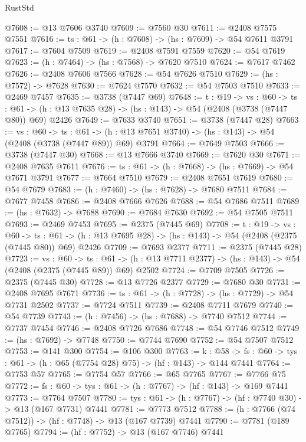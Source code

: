 \begin{lexlean}{RustStd}
\begin{coremodule}
@7608 := @13 @7606 @3740
@7609 := @7560 @30
@7611 := @2408 @7575 @7551
@7616 := {ts : @61} -> (h : @7608) -> (hs : @7609) -> @54 @7611 @3791
@7617 := @7604 @7509
@7619 := @2408 @7591 @7559
@7620 := @54 @7619
@7623 := (h : @7464) -> (hs : @7568) -> @7620 @7510
@7624 := @7617 @7462
@7626 := @2408 @7606 @7566
@7628 := @54 @7626 @7510
@7629 := (hs : @7572) -> @7628
@7630 := @7624 @7570
@7632 := @54 @7503 @7510
@7633 := @2469 @7457
@7635 := @3738 (@7447 @69)
@7648 := {t : @19} ->
  {vs : @60} ->
  {ts : @61} -> (h : @13 @7635 @28) -> (hs : @143) -> @54 (@2408 (@3738 (@7447 @80)) @69) @2426
@7649 := @7633 @3740
@7651 := @3738 (@7447 @28)
@7663 := {vs : @60} ->
  {ts : @61} -> (h : @13 @7651 @3740) -> (hs : @143) -> @54 (@2408 (@3738 (@7447 @89)) @69) @3791
@7664 := @7649 @7503
@7666 := @3738 (@7447 @30)
@7668 := @13 @7666 @3740
@7669 := @7620 @30
@7671 := @2408 @7635 @7611
@7676 := {ts : @61} -> (h : @7668) -> (hs : @7669) -> @54 @7671 @3791
@7677 := @7664 @7510
@7679 := @2408 @7651 @7619
@7680 := @54 @7679
@7683 := (h : @7460) -> (hs : @7628) -> @7680 @7511
@7684 := @7677 @7458
@7686 := @2408 @7666 @7626
@7688 := @54 @7686 @7511
@7689 := (hs : @7632) -> @7688
@7690 := @7684 @7630
@7692 := @54 @7505 @7511
@7693 := @2469 @7453
@7695 := @2375 (@7445 @69)
@7708 := {t : @19} ->
  {vs : @60} ->
  {ts : @61} -> (h : @13 @7695 @28) -> (hs : @143) -> @54 (@2408 (@2375 (@7445 @80)) @69) @2426
@7709 := @7693 @2377
@7711 := @2375 (@7445 @28)
@7723 := {vs : @60} ->
  {ts : @61} -> (h : @13 @7711 @2377) -> (hs : @143) -> @54 (@2408 (@2375 (@7445 @89)) @69) @2502
@7724 := @7709 @7505
@7726 := @2375 (@7445 @30)
@7728 := @13 @7726 @2377
@7729 := @7680 @30
@7731 := @2408 @7695 @7671
@7736 := {ts : @61} -> (h : @7728) -> (hs : @7729) -> @54 @7731 @2502
@7737 := @7724 @7511
@7739 := @2408 @7711 @7679
@7740 := @54 @7739
@7743 := (h : @7456) -> (hs : @7688) -> @7740 @7512
@7744 := @7737 @7454
@7746 := @2408 @7726 @7686
@7748 := @54 @7746 @7512
@7749 := (hs : @7692) -> @7748
@7750 := @7744 @7690
@7752 := @54 @7507 @7512
@7753 := @141 @300
@7754 := @106 @300
@7763 := {k : @58} ->
  {fs : @60} -> {tys : @61} -> (h : @65 (@7754 @28) @75) -> (hf : @143) -> @144 @7441
@7764 := @7753 @57
@7765 := @7754 @57
@7766 := @65 @7765
@7767 := @7766 @75
@7772 := {fs : @60} -> {tys : @61} -> (h : @7767) -> (hf : @143) -> @169 @7441
@7773 := @7764 @7507
@7780 := {tys : @61} -> (h : @7767) -> (hf : @7740 @30) -> @13 (@167 @7731) @7441
@7781 := @7773 @7512
@7788 := (h : @7766 (@74 @7512)) -> (hf : @7748) -> @13 (@167 @7739) @7441
@7790 := @7781 (@189 @7765)
@7794 := (hf : @7752) -> @13 (@167 @7746) @7441

\end{coremodule}
\end{lexlean}
